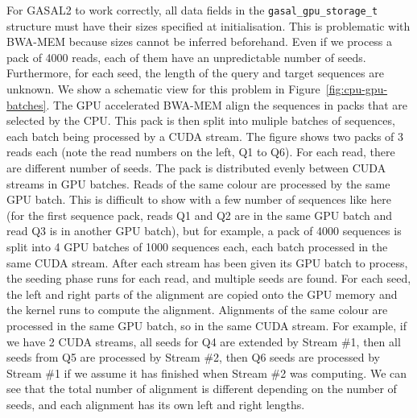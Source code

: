 For GASAL2 to work correctly, all data fields in the \texttt{gasal\_gpu\_storage\_t} structure must have their sizes specified at initialisation. This is problematic with BWA-MEM because sizes cannot be inferred beforehand. Even if we process a pack of 4000 reads, each of them have an unpredictable number of seeds. Furthermore, for each seed, the length of the query and target sequences are unknown. We show a schematic view for this problem in Figure~\ref{fig:cpu-gpu-batches}. The GPU accelerated BWA-MEM align the sequences in packs that are selected by the CPU. This pack is then split into muliple batches of sequences, each batch being processed by a CUDA stream. The figure shows two packs of 3 reads each (note the read numbers on the left, Q1 to Q6). For each read, there are different number of seeds. The pack is distributed evenly between CUDA streams in GPU batches. Reads of the same colour are processed by the same GPU batch. This is difficult to show with a few number of sequences like here (for the first sequence pack, reads Q1 and Q2 are in the same GPU batch and read Q3 is in another GPU batch), but for example, a pack of 4000 sequences is split into 4 GPU batches of 1000 sequences each, each batch processed in the same CUDA stream. After each stream has been given its GPU batch to process, the seeding phase runs for each read, and multiple seeds are found. For each seed, the left and right parts of the alignment are copied onto the GPU memory and the kernel runs to compute the alignment. Alignments of the same colour are processed in the same GPU batch, so in the same CUDA stream. For example, if we have 2 CUDA streams, all seeds for Q4 are extended by Stream \#1, then all seeds from Q5 are processed by Stream \#2, then Q6 seeds are processed by Stream \#1 if we assume it has finished when Stream \#2 was computing. We can see that the total number of alignment is different depending on the number of seeds, and each alignment has its own left and right lengths.

